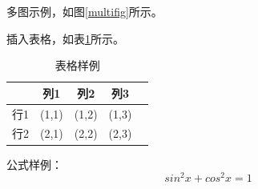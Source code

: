 多图示例，如图\ref{multifig}所示。\par
插入表格，如表\ref{tab:sample_table}所示。\par
\begin{table}[htb]
\centering
\caption{表格样例}
\label{tab:sample_table}
\begin{tabular}{lcccc}
\hline
~~&列1&列2&列3\\
\hline
行1 & (1,1) & (1,2) & (1,3)\\
行2 & (2,1) & (2,2) & (2,3)\\
\hline
\end{tabular}
\end{table}

公式样例：
\begin{equation}
sin^2x+cos^2x=1
\end{equation}